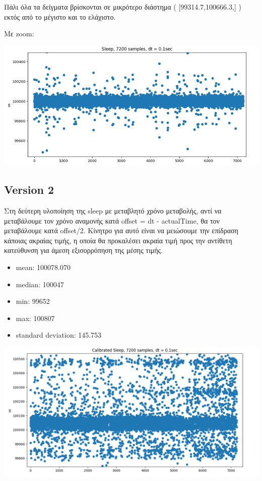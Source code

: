 \documentclass[12pt,a4paper]{article}
\begin{document}
Πάλι όλα τα δείγματα βρίσκονται σε μικρότερο διάστημα ( [99314.7,100666.3,] ) εκτός από το μέγιστο και το ελάχιστο.


Mε zoom:

\includegraphics[scale=0.6]{cal_sleep_better_sctr_zoom.png}


\subsection*{Version 2}
Στη δεύτερη υλοποίηση της sleep με μεταβλητό χρόνο μεταβολής, αντί να μεταβάλουμε τον χρόνο αναμονής κατά offset = dt - actualTime, θα τον μεταβάλουμε κατά offset/2. Κίνητρο για αυτό είναι να μειώσουμε την επίδραση κάποιας ακραίας τιμής, η οποία θα προκαλέσει ακραία τιμή προς την αντίθετη κατεύθυνση για άμεση εξισορρόπηση της μέσης τιμής.

\begin{itemize}
\item mean: 100078.070
\item median: 100047
\item min: 99652
\item max: 100807
\item standard deviation:  145.753
\end{itemize}


\includegraphics[scale=0.6]{cal_sleep_2_sctr.png}
\end{document}
